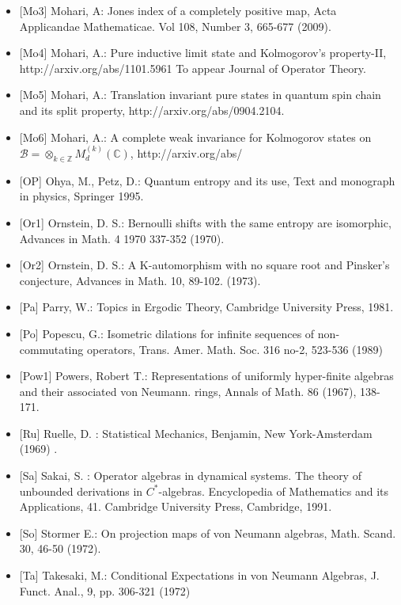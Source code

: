 \documentclass[a4paper,Haag duality]{mathscan}
\theoremstyle{definition}
\newcommand{\dsp}{\displaystyle}
\newcommand{\IC}{\mathbb{C}}
\newcommand{\IZ}{\mathbb{Z}}
\newcommand{\cal}{\mathcal}
\newcommand{\clb}{{\cal B}}
\begin{document}
\begin{itemize}
\item{[Mo3]} Mohari, A: Jones index of a completely positive map, Acta Applicandae Mathematicae. Vol 108, Number 3, 665-677 
(2009).  

\item{[Mo4]} Mohari, A.: Pure inductive limit state and Kolmogorov's property-II,  http://arxiv.org/abs/1101.5961 To appear Journal of Operator Theory. 

\item{[Mo5]} Mohari, A.: Translation invariant pure states in quantum spin chain and its split property, http://arxiv.org/abs/0904.2104. 

\item{[Mo6]} Mohari, A.: A complete weak invariance for Kolmogorov states on $\clb = \dsp{\otimes_{k \in \IZ}}\!M^{(k)}_d(\IC)$, http://arxiv.org/abs/

\item {[OP]} Ohya, M., Petz, D.: Quantum entropy and its use, Text and monograph in physics, Springer 1995. 

\item{[Or1]} Ornstein, D. S.: Bernoulli shifts with the same entropy are isomorphic, Advances in Math. 4 1970 337-352 (1970).

\item{[Or2]} Ornstein, D. S.: A K-automorphism with no square root and Pinsker's conjecture, 
Advances in Math. 10, 89-102. (1973).

\item{[Pa]} Parry, W.: Topics in Ergodic Theory, Cambridge University Press, 1981. 

\item{[Po]} Popescu, G.: Isometric dilations for infinite sequences of non-commutating operators, Trans. Amer. Math.
Soc. 316 no-2, 523-536 (1989)

\item{[Pow1]} Powers, Robert T.: Representations of uniformly hyper-finite algebras and their associated von Neumann. rings, Annals of Math. 86 (1967), 138-171.

\item{[Ru]} Ruelle, D. : Statistical Mechanics, Benjamin, New York-Amsterdam (1969) . 

\item{[Sa]} Sakai, S. : Operator algebras in dynamical systems. The theory of unbounded derivations in $C^*$-algebras. 
Encyclopedia of Mathematics and its Applications, 41. Cambridge University Press, Cambridge, 1991. 

\item{[So]} Stormer E.: On projection maps of von Neumann algebras, Math. Scand. 30, 46-50 (1972). 

\item{[Ta]} Takesaki, M.: Conditional Expectations in von Neumann Algebras, J. Funct. Anal., 9, pp. 306-321 (1972)


\end{itemize}
\end{document}
